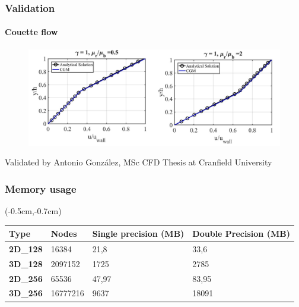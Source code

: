 \documentclass[xcolor=table]{beamer}
\begin{document}
\begin{frame}
\begin{textblock*}{5cm}
\begin{figure}
					\end{figure}
				\end{textblock*}
		\end{frame}
		\begin{frame}
			\frametitle{Validation}
			\framesubtitle{Couette flow}
			\begin{figure}
				\centering
				\includegraphics[scale=0.2]{Resources/couette.png}
			\end{figure}
			\small Validated by Antonio González, MSc CFD Thesis at Cranfield University
		\end{frame}
		\begin{frame}
			\frametitle{Memory usage}
	\small
	\begin{textblock*}{5cm}(-0.5cm,-0.7cm)
\begin{table}[]
	\centering
	\begin{tabular}{l|lll}
		\textbf{Type}    & \textbf{Nodes} & \textbf{Single precision (MB)}                     & \textbf{Double Precision (MB)}                     \\ \hline
		\textbf{2D\_128} & 16384                    & \cellcolor[HTML]{EFEFEF}21,8  & \cellcolor[HTML]{C0C0C0}33,6 \\
		\textbf{3D\_128} & 2097152                  & \cellcolor[HTML]{EFEFEF}1725                  & \cellcolor[HTML]{C0C0C0}2785                  \\
		\textbf{2D\_256} & 65536                    & \cellcolor[HTML]{EFEFEF}47,97 & \cellcolor[HTML]{C0C0C0}83,95 \\
		\textbf{3D\_256} & 16777216                 & \cellcolor[HTML]{EFEFEF}9637                  & \cellcolor[HTML]{C0C0C0}18091                
	\end{tabular}
\end{table}
\end{textblock*}
		\end{frame}
\end{document}
